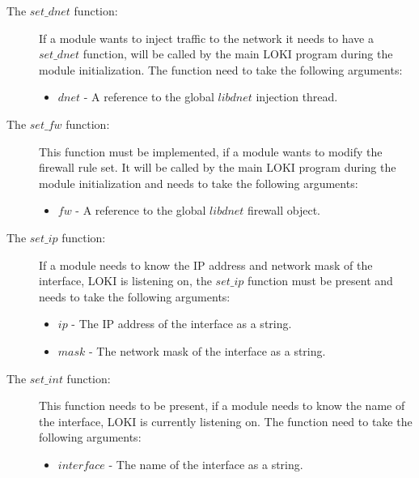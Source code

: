 \documentclass[a4paper, 11pt]{article}
\begin{document}
                \begin{description}
                    \item[The $set\_dnet$ function:] If a module wants to inject traffic to the network it needs to have a $set\_dnet$ function, will be called by the main LOKI program during the module initialization. The function need to take the following arguments:
                        \begin{itemize}
                            \item $dnet$ - A reference to the global $libdnet$ injection thread.
                        \end{itemize}
                    \item[The $set\_fw$ function:] This function must be implemented, if a module wants to modify the firewall rule set. It will be called by the main LOKI program during the module initialization and needs to take the following arguments:
                        \begin{itemize}
                            \item $fw$ - A reference to the global $libdnet$ firewall object.
                        \end{itemize}
                    \item[The $set\_ip$ function:] If a module needs to know the IP address and network mask of the interface, LOKI is listening on, the $set\_ip$ function must be present and needs to take the following arguments:
                        \begin{itemize}
                            \item $ip$ - The IP address of the interface as a string.
                            \item $mask$ - The network mask of the interface as a string.
                        \end{itemize}
                    \item[The $set\_int$ function:] This function needs to be present, if a module needs to know the name of the interface, LOKI is currently listening on. The function need to take the following arguments:
                        \begin{itemize}
                            \item $interface$ - The name of the interface as a string.
                        \end{itemize}
                \end{description}
                
\end{document}

